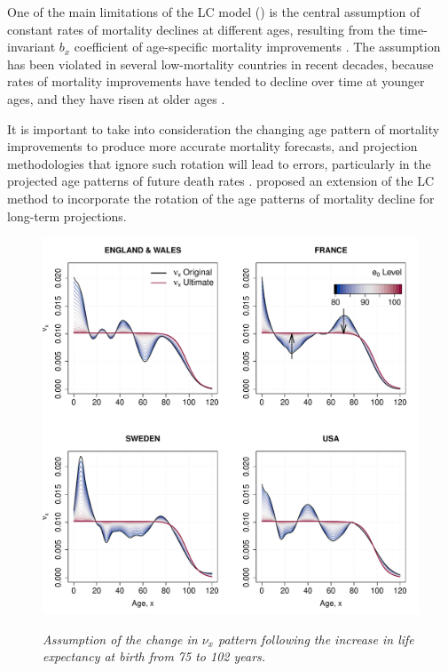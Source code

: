 \documentclass[risks,article,submit,moreauthors,pdftex]{Definitions/mdpi}
\begin{document}
One of the main limitations of the LC model (\citeyear{lee1992}) is the central assumption of constant rates of mortality declines at different ages, resulting from the time-invariant $b_x$ coefficient of age-specific mortality improvements \citep{bongaarts2005}. The assumption has been violated in several low-mortality countries in recent decades, because  rates of mortality improvements have tended to decline over time at younger ages, and they have risen at older ages \citep{kannisto1994,vaupel1998,wilmoth1999}. 

It is important to take into consideration the changing age pattern of mortality improvements to produce more accurate mortality forecasts, and projection methodologies that ignore such rotation will lead to errors, particularly in the projected age patterns of future death rates \citep{li2013}. \citeauthor{li2013} proposed an extension of the LC method to incorporate the rotation of the age patterns of mortality decline for long-term projections. 

\begin{figure}[!h]

{\centering \includegraphics[width=1\linewidth]{Figure10-1}}

\caption{\textit{Assumption of the change in $\nu_x$ pattern following the increase in life expectancy at birth from 75 to 102 years.}}\label{fig:Figure10}
\end{figure}
\end{document}
